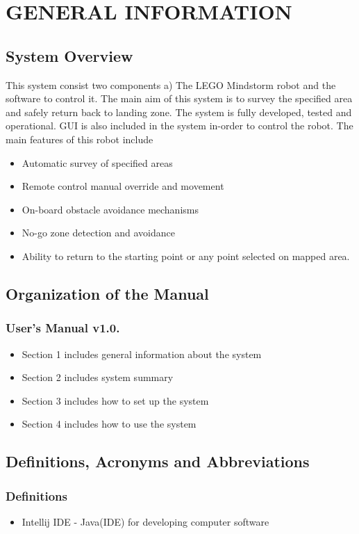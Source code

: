 \documentclass[10pt,a4paper,titlepage]{article}
\begin{document}
	\newpage
	
	\section{GENERAL INFORMATION}
		\subsection{System Overview}
        This system consist two components a) The LEGO Mindstorm robot and the software to control it. The main aim of this system is to survey the specified area and safely return back to landing zone. The system is fully developed, tested and operational. GUI is also included in the system in-order to control the robot.
        The main features of this robot include
	\begin{itemize}
		\item Automatic survey of specified areas
		\item Remote control manual override and movement
		\item On-board obstacle avoidance mechanisms 
		\item No-go zone detection and avoidance
		\item Ability to return to the starting point or any point selected on mapped area.
\end{itemize}
   

        \subsection{Organization of the Manual}
        \subsubsection{User’s Manual v1.0.}
        \begin{itemize}
		\item Section 1 includes general information about the system
		\item Section 2 includes system summary
		\item Section 3 includes how to set up the system
		\item Section 4 includes how to use the system
\end{itemize}
        \subsection{Definitions, Acronyms and Abbreviations}
        \subsubsection{Definitions}
\begin{itemize}
\item Intellij IDE - Java(IDE) for developing computer software
\end{itemize}
\end{document}
